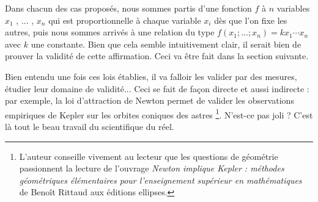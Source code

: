 

\medskip

Dans chacun des cas proposés, nous sommes partis d'une fonction $f$ à $n$ variables $x_1$ , ... , $x_n$ qui est proportionnelle à chaque variable $x_i$ dès que l'on fixe les autres,
puis nous sommes arrivés à une relation du type $f(x_1 ; ... ; x_n) = k x_1 \cdots x_n$ avec $k$ une constante. Bien que cela semble intuitivement clair, il serait bien de prouver la validité de cette affirmation. Ceci va être fait dans la section suivante.




\begin{remark}
	Bien entendu une fois ces lois établies, il va falloir les valider par des mesures, étudier leur domaine de validité... Ceci se fait de façon directe et aussi indirecte : par exemple, la loi d'attraction de Newton permet de valider les observations empiriques de Kepler sur les orbites coniques des astres
	\footnote{
		L'auteur conseille vivement au lecteur que les questions de géométrie passionnent la lecture de l'ouvrage \emph{\og Newton implique Kepler : méthodes géométriques élémentaires pour l'enseignement supérieur en mathématiques \fg} de Benoît Rittaud aux éditions ellipses.
	}. 
	N'est-ce pas joli ? C'est là tout le beau travail du scientifique du réel.
\end{remark}